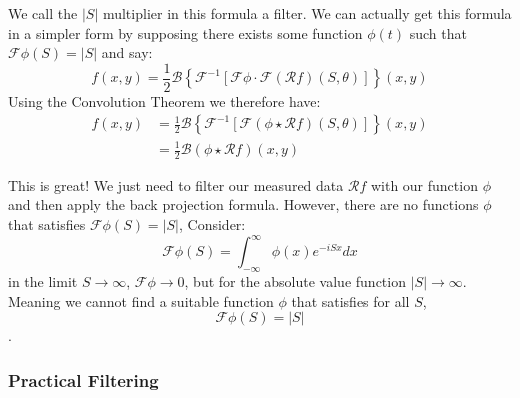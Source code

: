 \documentclass{article}
\theoremstyle{definition}
\begin{document}
We call the $|S|$ multiplier in this formula a filter. We can actually get this formula in a simpler form by supposing there exists some function $\phi(t)$ such that $\mathcal{F}\phi (S) = |S|$ and say:
$$
f(x,y) = \frac{1}{2} \mathcal{B} \left\lbrace \mathcal{F}^{-1} \left[ \mathcal{F}\phi \cdot \mathcal{F} \left( \mathcal{R}f \right) \left( S, \theta \right) \right] \right\rbrace (x,y)
$$
Using the Convolution Theorem \cite{wolfram_convolution} we therefore have:
\begin{align*}
f(x,y) &= \frac{1}{2} \mathcal{B} \left\lbrace \mathcal{F}^{-1} \left[ \mathcal{F} \left(\phi \star \mathcal{R}f \right) \left( S, \theta \right) \right] \right\rbrace (x,y) \\
&= \frac{1}{2} \mathcal{B} \left(\phi \star \mathcal{R}f \right) (x,y)
\end{align*}

This is great! We just need to filter our measured data $\mathcal{R}f$ with our function $\phi$ and then apply the back projection formula. However, there are no functions $\phi$ that satisfies $\mathcal{F} \phi(S) = |S|$, Consider:
$$
\mathcal{F}\phi(S) = \int_{-\infty}^{\infty} \phi(x)e^{-iSx} dx
$$
in the limit $S \to \infty$, $\mathcal{F}\phi \to 0$, but for the absolute value function $|S| \to \infty$. Meaning we cannot find a suitable function $\phi$ that satisfies for all $S$, 
$$\mathcal{F}\phi(S) = |S|$$.

\subsubsection{Practical Filtering}



\end{document}
